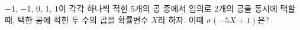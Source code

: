 $-1$, $-1$, $0$, $1$, $1$이 각각 하나씩 적힌 5개의 공 중에서 임의로 2개의 공을 동시에 택할 때, 택한 공에 적힌 두 수의 곱을 확률변수 $X$라 하자. 이때 $\sigma(-5X+1)$은?
